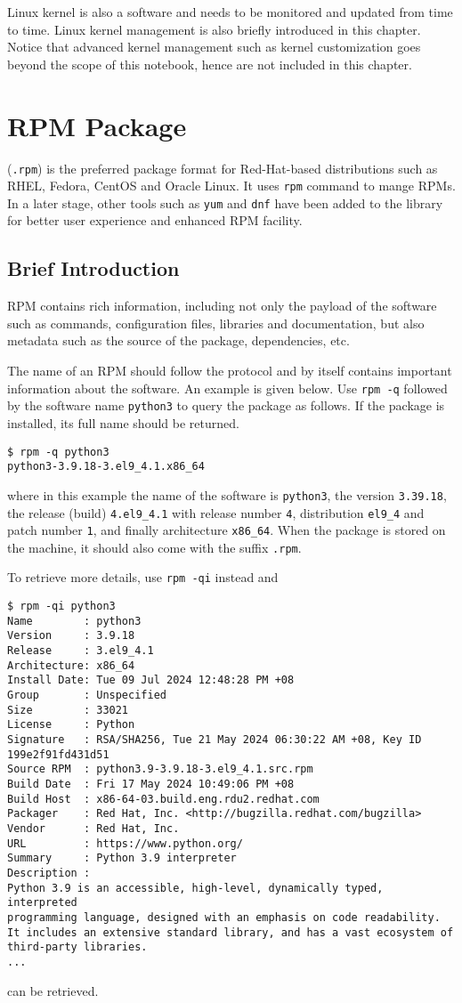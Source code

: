 Linux kernel is also a software and needs to be monitored and updated from time to time. Linux kernel management is also briefly introduced in this chapter. Notice that advanced kernel management such as kernel customization goes beyond the scope of this notebook, hence are not included in this chapter.

\section{RPM Package}

 (\verb|.rpm|) is the preferred package format for Red-Hat-based distributions such as RHEL, Fedora, CentOS and Oracle Linux. It uses \verb|rpm| command to mange RPMs. In a later stage, other tools such as \verb|yum| and \verb|dnf| have been added to the library for better user experience and enhanced RPM facility. 

\subsection{Brief Introduction}

RPM contains rich information, including not only the payload of the software such as commands, configuration files, libraries and documentation, but also metadata such as the source of the package, dependencies, etc.

The name of an RPM should follow the protocol and by itself contains important information about the software. An example is given below. Use \verb|rpm -q| followed by the software name \verb|python3| to query the package as follows. If the package is installed, its full name should be returned.
\begin{lstlisting}
$ rpm -q python3
python3-3.9.18-3.el9_4.1.x86_64
\end{lstlisting}
where in this example the name of the software is \verb|python3|, the version \verb|3.39.18|, the release (build) \verb|4.el9_4.1| with release number \verb|4|, distribution \verb|el9_4| and patch number \verb|1|, and finally architecture \verb|x86_64|. When the package is stored on the machine, it should also come with the suffix \verb|.rpm|. 

To retrieve more details, use \verb|rpm -qi| instead and
\begin{lstlisting}
$ rpm -qi python3
Name        : python3
Version     : 3.9.18
Release     : 3.el9_4.1
Architecture: x86_64
Install Date: Tue 09 Jul 2024 12:48:28 PM +08
Group       : Unspecified
Size        : 33021
License     : Python
Signature   : RSA/SHA256, Tue 21 May 2024 06:30:22 AM +08, Key ID 199e2f91fd431d51
Source RPM  : python3.9-3.9.18-3.el9_4.1.src.rpm
Build Date  : Fri 17 May 2024 10:49:06 PM +08
Build Host  : x86-64-03.build.eng.rdu2.redhat.com
Packager    : Red Hat, Inc. <http://bugzilla.redhat.com/bugzilla>
Vendor      : Red Hat, Inc.
URL         : https://www.python.org/
Summary     : Python 3.9 interpreter
Description :
Python 3.9 is an accessible, high-level, dynamically typed, interpreted
programming language, designed with an emphasis on code readability.
It includes an extensive standard library, and has a vast ecosystem of
third-party libraries.
...
\end{lstlisting}
can be retrieved.

